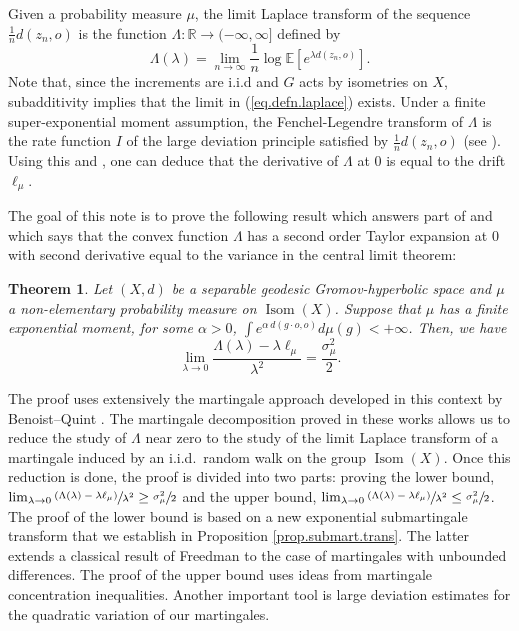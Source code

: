 \documentclass[JEP,XML,SOM,Unicode,published]{cedram}
\newcommand{\psfrac}[2]{\sfrac{(#1)}{#2}}
\theoremstyle{plain}
\newtheorem{theorem}{Theorem}[section]
\theoremstyle{definition}
\newcommand\R{\mathbb{R}}
\DeclareMathOperator\Isom{Isom}
\begin{document}
Given a probability measure $\mu$, the limit Laplace transform of the sequence $\frac{1}{n}d(z_n,o)$ is the function $\Lambda:\R \to (-\infty,\infty]$ defined by\vspace*{-3pt}\enlargethispage{.5\baselineskip}
\begin{equation}\label{eq.defn.laplace}
\Lambda(\lambda)=\lim_{n \to \infty} \frac{1}{n} \log \mathbb{E}[e^{\lambda d(z_n,o)}].
\end{equation}
Note that, since the increments are i.i.d and $G$ acts by isometries on $X$, subadditivity implies that the limit in (\ref{eq.defn.laplace}) exists. Under a finite super-exponential moment assumption, the Fenchel-Legendre transform of $\Lambda$ is the rate function $I$ of the large deviation principle satisfied by $\frac{1}{n}d(z_n, o)$ (see \cite[Lem.\,C.2]{BMSS}).
Using this and \cite[Th.\,1.1]{BMSS}, one can deduce that the derivative of $\Lambda$ at 0 is equal to the drift $\ell_{\mu}$.

The goal of this note is to prove the following result which answers part of \hbox{\cite[Quest.\,C.1]{BMSS}} and which says that the convex function $\Lambda$ has a second order Taylor expan\-sion at $0$ with second derivative equal to the variance in the central limit theorem:
\begin{theorem}\label{thm.main}
Let $(X,d)$ be a separable geodesic Gromov-hyperbolic space and $\mu$ a non-elementary probability measure on $\Isom(X)$. Suppose that $\mu$ has a finite exponential moment, \ie for some $\alpha>0$, $\int{e^{\alpha \,d(g\cdot o, o)} d\mu(g)}<+\infty$. Then, we have\vspace*{-3pt}
\[
\lim_{\lambda\to 0} \frac{\Lambda(\lambda)-\lambda \ell_\mu}{\lambda^2}=\frac{\sigma_\mu^2}{2}.
\]
\end{theorem}

The proof uses extensively the martingale approach developed in this context by Benoist--Quint \cite{BQ.CLT,BQ.hyperbolic}. The martingale decomposition proved in these works allows us to reduce the study of $\Lambda$ near zero to the study of the limit Laplace transform of a martingale induced by an i.i.d.\ random walk on the group $\Isom(X)$. Once this reduction is done, the proof is divided into two parts: proving the lower bound, \ie $\lim_{\lambda\to 0} \psfrac{\Lambda(\lambda)-\lambda \ell_\mu}{\lambda^2}\geq \sfrac{\sigma_\mu^2}{2}$ and the upper bound, \ie $\lim_{\lambda\to 0} \psfrac{\Lambda(\lambda)-\lambda \ell_\mu}{\lambda^2}\leq \sfrac{\sigma_\mu^2}{2}$.
The proof of the lower bound is based on a new exponential submartingale transform that we establish in Proposition \ref{prop.submart.trans}. The latter extends a classical result of Freedman \cite{Freedman} to the case of martingales with unbounded differences. The proof of the upper bound
uses ideas from martingale concentration inequalities. Another important tool is large deviation estimates for the quadratic variation of our martingales.
\end{document}
